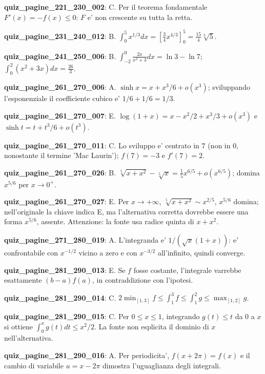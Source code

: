\documentclass[11pt,a4paper]{article}
\newcounter{quiz}
\begin{document}
\noindent\textbf{quiz\_pagine\_221\_230\_002}: C. Per il teorema fondamentale $F'(x)=-f(x)\leq0$: $F$ e' non crescente su tutta la retta.\par\medskip
\noindent\textbf{quiz\_pagine\_231\_240\_012}: B. $\int_0^5 x^{1/3}dx=[\frac34x^{4/3}]_0^5=\frac{15}{4}\sqrt[3]{5}$.\par\medskip
\noindent\textbf{quiz\_pagine\_241\_250\_006}: B. $\int_{-2}^0\frac{2x}{x^2+3}dx=\ln3-\ln7$; $\int_0^2(x^2+3x)dx=\frac{26}{3}$.\par\medskip
\noindent\textbf{quiz\_pagine\_261\_270\_006}: A. $\sinh x=x+x^3/6+o(x^3)$; sviluppando l'esponenziale il coefficiente cubico e' $1/6+1/6=1/3$.\par\medskip
\noindent\textbf{quiz\_pagine\_261\_270\_007}: E. $\log(1+x)=x-x^2/2+x^3/3+o(x^3)$ e $\sinh t=t+t^3/6+o(t^3)$.\par\medskip
\noindent\textbf{quiz\_pagine\_261\_270\_011}: C. Lo sviluppo e' centrato in $7$ (non in $0$, nonostante il termine 'Mac Laurin'); $f(7)=-3$ e $f'(7)=2$.\par\medskip
\noindent\textbf{quiz\_pagine\_261\_270\_026}: B. $\sqrt[5]{x+x^2}-\sqrt[5]{x}=\frac15x^{6/5}+o(x^{6/5})$; domina $x^{5/6}$ per $x\to0^+$.\par\medskip
\noindent\textbf{quiz\_pagine\_261\_270\_027}: E. Per $x\to+\infty$, $\sqrt[5]{x+x^2}\sim x^{2/5}$, $x^{5/6}$ domina; nell'originale la chiave indica E, ma l'alternativa corretta dovrebbe essere una forma $x^{5/6}$, assente. Attenzione: la fonte usa radice quinta di $x+x^2$.\par\medskip
\noindent\textbf{quiz\_pagine\_271\_280\_019}: A. L'integranda e' $1/(\sqrt x(1+x))$: e' confrontabile con $x^{-1/2}$ vicino a zero e con $x^{-3/2}$ all'infinito, quindi converge.\par\medskip
\noindent\textbf{quiz\_pagine\_281\_290\_013}: E. Se $f$ fosse costante, l'integrale varrebbe esattamente $(b-a)f(a)$, in contraddizione con l'ipotesi.\par\medskip
\noindent\textbf{quiz\_pagine\_281\_290\_014}: C. $2\min_{[1,3]}f\leq\int_1^3f\leq\int_1^2g\leq\max_{[1,2]}g$.\par\medskip
\noindent\textbf{quiz\_pagine\_281\_290\_015}: C. Per $0\leq x\leq1$, integrando $g(t)\leq t$ da 0 a $x$ si ottiene $\int_0^x g(t)dt\leq x^2/2$. La fonte non esplicita il dominio di $x$ nell'alternativa.\par\medskip
\noindent\textbf{quiz\_pagine\_281\_290\_016}: A. Per periodicita', $f(x+2\pi)=f(x)$ e il cambio di variabile $u=x-2\pi$ dimostra l'uguaglianza degli integrali.\par\medskip
\end{document}
